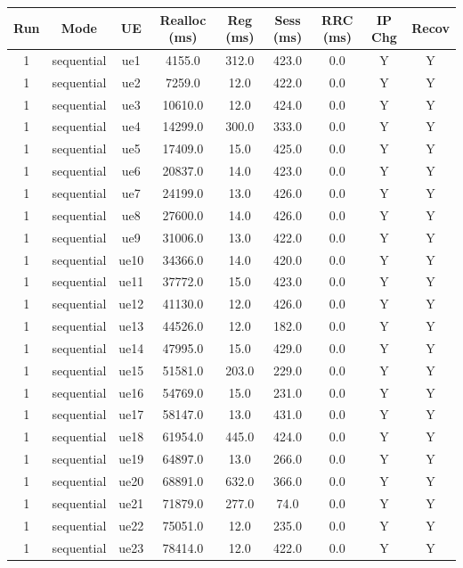 \begin{table}[ht]
\centering
\begin{tabular}{|c|c|c|c|c|c|c|c|c|}
\hline
Run & Mode & UE & Realloc (ms) & Reg (ms) & Sess (ms) & RRC (ms) & IP Chg & Recov \\
\hline
1 & sequential & ue1 & 4155.0 & 312.0 & 423.0 & 0.0 & Y & Y \\
1 & sequential & ue2 & 7259.0 & 12.0 & 422.0 & 0.0 & Y & Y \\
1 & sequential & ue3 & 10610.0 & 12.0 & 424.0 & 0.0 & Y & Y \\
1 & sequential & ue4 & 14299.0 & 300.0 & 333.0 & 0.0 & Y & Y \\
1 & sequential & ue5 & 17409.0 & 15.0 & 425.0 & 0.0 & Y & Y \\
1 & sequential & ue6 & 20837.0 & 14.0 & 423.0 & 0.0 & Y & Y \\
1 & sequential & ue7 & 24199.0 & 13.0 & 426.0 & 0.0 & Y & Y \\
1 & sequential & ue8 & 27600.0 & 14.0 & 426.0 & 0.0 & Y & Y \\
1 & sequential & ue9 & 31006.0 & 13.0 & 422.0 & 0.0 & Y & Y \\
1 & sequential & ue10 & 34366.0 & 14.0 & 420.0 & 0.0 & Y & Y \\
1 & sequential & ue11 & 37772.0 & 15.0 & 423.0 & 0.0 & Y & Y \\
1 & sequential & ue12 & 41130.0 & 12.0 & 426.0 & 0.0 & Y & Y \\
1 & sequential & ue13 & 44526.0 & 12.0 & 182.0 & 0.0 & Y & Y \\
1 & sequential & ue14 & 47995.0 & 15.0 & 429.0 & 0.0 & Y & Y \\
1 & sequential & ue15 & 51581.0 & 203.0 & 229.0 & 0.0 & Y & Y \\
1 & sequential & ue16 & 54769.0 & 15.0 & 231.0 & 0.0 & Y & Y \\
1 & sequential & ue17 & 58147.0 & 13.0 & 431.0 & 0.0 & Y & Y \\
1 & sequential & ue18 & 61954.0 & 445.0 & 424.0 & 0.0 & Y & Y \\
1 & sequential & ue19 & 64897.0 & 13.0 & 266.0 & 0.0 & Y & Y \\
1 & sequential & ue20 & 68891.0 & 632.0 & 366.0 & 0.0 & Y & Y \\
1 & sequential & ue21 & 71879.0 & 277.0 & 74.0 & 0.0 & Y & Y \\
1 & sequential & ue22 & 75051.0 & 12.0 & 235.0 & 0.0 & Y & Y \\
1 & sequential & ue23 & 78414.0 & 12.0 & 422.0 & 0.0 & Y & Y \\

\end{tabular}
\end{table}
